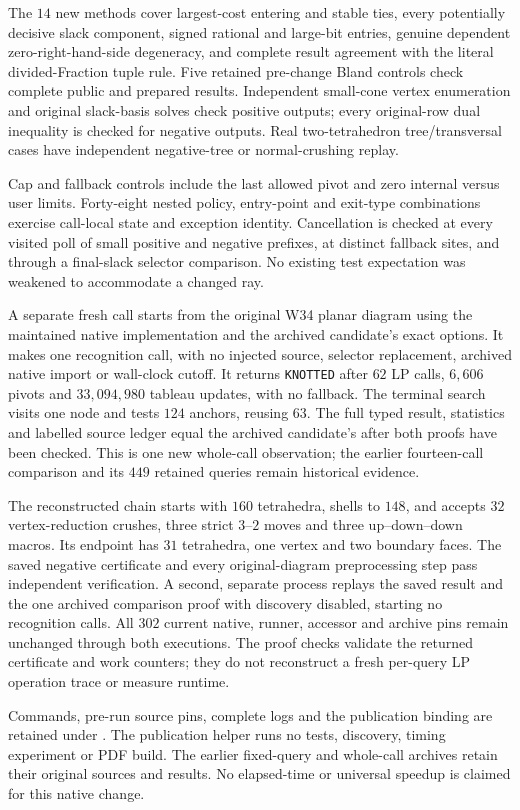 The $14$ new methods cover largest-cost entering and stable ties, every
potentially decisive slack component, signed rational and large-bit entries,
genuine dependent zero-right-hand-side degeneracy, and complete result
agreement with the literal divided-Fraction tuple rule.  Five retained
pre-change Bland controls check complete public and prepared results.
Independent small-cone vertex enumeration and original slack-basis solves
check positive outputs; every original-row dual inequality is checked for
negative outputs.  Real two-tetrahedron tree/transversal cases have independent
negative-tree or normal-crushing replay.

Cap and fallback controls include the last allowed pivot and zero internal
versus user limits.  Forty-eight nested policy, entry-point and exit-type
combinations exercise call-local state and exception identity.  Cancellation
is checked at every visited poll of small positive and negative prefixes,
at distinct fallback sites, and through a final-slack selector comparison.
No existing test expectation was weakened to accommodate a changed ray.

A separate fresh call starts from the original W34 planar diagram using the
maintained native implementation and the archived candidate's exact options.
It makes one recognition call, with no injected source, selector replacement,
archived native import or wall-clock cutoff.  It returns \texttt{KNOTTED}
after $62$ LP calls, $6{,}606$ pivots and $33{,}094{,}980$ tableau updates,
with no fallback.  The terminal search visits one node and tests $124$
anchors, reusing $63$.  The full typed result, statistics and labelled source
ledger equal the archived candidate's after both proofs have been checked.
This is one new whole-call observation; the earlier fourteen-call comparison
and its $449$ retained queries remain historical evidence.

The reconstructed chain starts with $160$ tetrahedra, shells to $148$, and
accepts $32$ vertex-reduction crushes, three strict $3$--$2$ moves and three
up--down--down macros.  Its endpoint has $31$ tetrahedra, one vertex and two
boundary faces.  The saved negative certificate and every original-diagram
preprocessing step pass independent verification.  A second, separate process
replays the saved result and the one archived comparison proof with discovery
disabled, starting no recognition calls.  All $302$ current native, runner,
accessor and archive pins remain unchanged through both executions.
The proof checks validate the returned certificate and work counters; they
do not reconstruct a fresh per-query LP operation trace or measure runtime.

Commands, pre-run source pins, complete logs and the publication binding are
retained under .  The publication helper runs
no tests, discovery, timing experiment or PDF build.  The earlier fixed-query
and whole-call archives retain their original sources and results.  No
elapsed-time or universal speedup is claimed for this native change.
